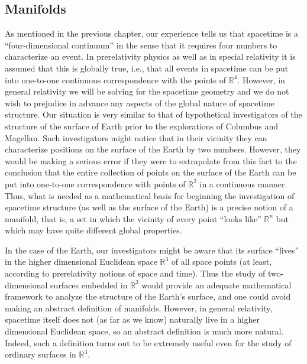 
\subsection{Manifolds}\label{sec:2.1}

As mentioned in the previous chapter, our experience tells us that spacetime is a
``four-dimensional continuum'' in the sense that it requires four numbers to
characterize an event.  In prerelativity physics as well as in special relativity it
is assumed that this is globally true, i.e., that all events in spacetime can be put
into one-to-one continuous correspondence with the points of \(\mathbb{R}^4\).
However, in general relativity we will be solving for the spacetime geometry and we
do not wish to prejudice in advance any aspects of the global nature of spacetime
structure.  Our situation is very similar to that of hypothetical investigators of
the structure of the surface of Earth prior to the explorations of Columbus and
Magellan.  Such investigators might notice that in their vicinity they can
characterize positions on the surface of the Earth by two numbers.  However, they
would be making a serious error if they were to extrapolate from this fact to the
conclusion that the entire collection of points on the surface of the Earth can be
put into one-to-one correspondence with points of \(\mathbb{R}^2\) in a continuous
manner.  Thus, what is needed as a mathematical basis for beginning the
investigation of spacetime structure (as well as the surface of the Earth) is a
precise notion of a manifold, that is, a set in which the vicinity of every point
``looks like'' \(\mathbb{R}^n\) but which may have quite different global
properties.

In the case of the Earth, our investigators might be aware that its surface ``lives''
in the higher dimensional Euclidean space \(\mathbb{R}^3\) of all space points (at
least, according to prerelativity notions of space and time).  Thus the study of
two-dimensional surfaces embedded in \(\mathbb{R}^3\) would provide an adequate
mathematical framework to analyze the structure of the Earth's surface, and one
could avoid making an abstract definition of manifolds.  However, in general
relativity, spacetime itself does not (as far as we know) naturally live in a higher
dimensional Euclidean space, so an abstract definition is much more natural.
Indeed, such a definition turns out to be extremely useful even for the study of
ordinary surfaces in \(\mathbb{R}^3\).


